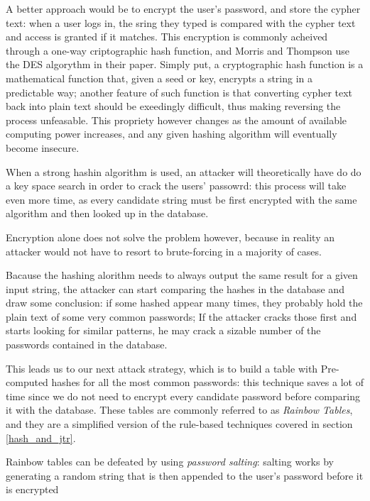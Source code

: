 A better approach would be to encrypt the user's password, and store the cypher text: when a user logs in, the sring they typed is compared with the cypher text and access is granted if it matches. This encryption is commonly acheived through a one-way criptographic hash function, and Morris and Thompson use the DES algorythm in their paper. %
Simply put, a cryptographic hash function is a mathematical function that, given a seed or key, encrypts a string in a predictable way; another feature of such function is that converting cypher text back into plain text should be exeedingly difficult, thus making reversing the process unfeasable.
This propriety however changes as the amount of available computing power increases, and any given hashing algorithm will eventually become insecure.

When a strong hashin algorithm is used, an attacker will theoretically have do do a key space search in order to crack the users' passowrd: this process will take even more time, as every candidate string must be first encrypted with the same algorithm and then looked up in the database.

Encryption alone does not solve the problem however, because in reality an attacker would not have to resort to brute-forcing in a majority of cases.

Bacause the hashing alorithm needs to always output the same result for a given input string, the attacker can start comparing the hashes in the database and draw some conclusion: if some hashed appear many times, they probably hold the plain text of some very common passwords; If the attacker cracks those first and starts looking for similar patterns, he may crack a sizable number of the passwords contained in the database.

This leads us to our next attack strategy, which is to build a table with Pre-computed hashes for all the most common passwords: this technique saves a lot of time since we do not need to encrypt every candidate password before comparing it with the database. These tables are commonly referred to as \emph{Rainbow Tables}, and they are a simplified version of the rule-based techniques covered in section \ref{hash_and_jtr}.

Rainbow tables can be defeated by using \emph{password salting}: salting works by generating a random string that is then appended to the user's password before it is encrypted


